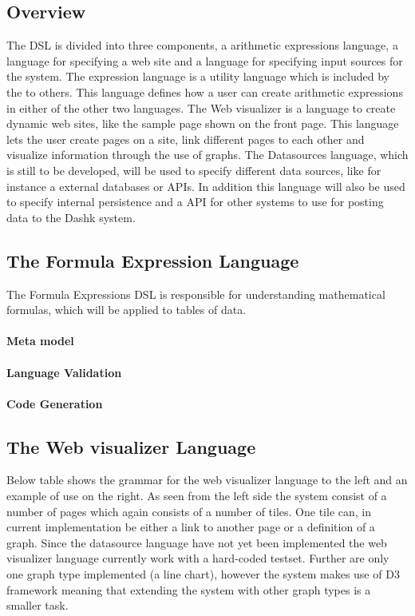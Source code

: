 
\subsection{Overview}
The DSL is divided into three components, a arithmetic expressions language, a language for specifying a web site and a language for specifying input sources for the system. 
The expression language is a utility language which is included by the to others. 
This language defines how a user can create arithmetic expressions in either of the other two languages. 
The Web visualizer is a language to create dynamic web sites, like the sample page shown on the front page. 
This language lets the user create pages on a site, link different pages to each other and visualize information through the use of graphs. 
The Datasources language, which is still to be developed, will be used to specify different data sources, like for instance a external databases or APIs. 
In addition this language will also be used to specify internal persistence and a API for other systems to use for posting data to the Dashk system.

\subsection{The Formula Expression Language}
The Formula Expressions DSL is responsible for understanding mathematical formulas, which will be applied to tables of data.
\paragraph{Meta model}
\paragraph{Language Validation}
\paragraph{Code Generation}


\subsection{The Web visualizer Language}
Below table shows the grammar for the web visualizer language to the left and an example of use on the right. 
As seen from the left side the system consist of a number of pages which again consists of a number of tiles. 
One tile can, in current implementation be either a link to another page or a definition of a graph. 
Since the datasource language have not yet been implemented the web visualizer language currently work with a hard-coded testset. 
Further are only one graph type implemented (a line chart), however the system makes use of D3 framework meaning that extending the system with other graph types is a smaller task.

